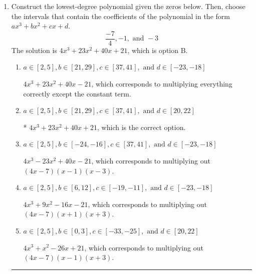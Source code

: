 \documentclass{extbook}[14pt]
\newcommand{\litem}[1]{\item #1

\rule{\textwidth}{0.4pt}}
\begin{document}
\begin{enumerate}\litem{
Construct the lowest-degree polynomial given the zeros below. Then, choose the intervals that contain the coefficients of the polynomial in the form $ax^3+bx^2+cx+d$.
\[ \frac{-7}{4}, -1, \text{ and } -3 \]The solution is \( 4x^{3} +23 x^{2} +40 x + 21 \), which is option B.\begin{enumerate}[label=\Alph*.]
\item \( a \in [2, 5], b \in [21, 29], c \in [37, 41], \text{ and } d \in [-23, -18] \)

$4x^{3} +23 x^{2} +40 x -21$, which corresponds to multiplying everything correctly except the constant term.
\item \( a \in [2, 5], b \in [21, 29], c \in [37, 41], \text{ and } d \in [20, 22] \)

* $4x^{3} +23 x^{2} +40 x + 21$, which is the correct option.
\item \( a \in [2, 5], b \in [-24, -16], c \in [37, 41], \text{ and } d \in [-23, -18] \)

$4x^{3} -23 x^{2} +40 x -21$, which corresponds to multiplying out $(4x -7)(x -1)(x -3)$.
\item \( a \in [2, 5], b \in [6, 12], c \in [-19, -11], \text{ and } d \in [-23, -18] \)

$4x^{3} +9 x^{2} -16 x -21$, which corresponds to multiplying out $(4x -7)(x + 1)(x + 3)$.
\item \( a \in [2, 5], b \in [0, 3], c \in [-33, -25], \text{ and } d \in [20, 22] \)

$4x^{3} + x^{2} -26 x + 21$, which corresponds to multiplying out $(4x -7)(x -1)(x + 3)$.
\end{enumerate}

}
\end{enumerate}
\end{document}
